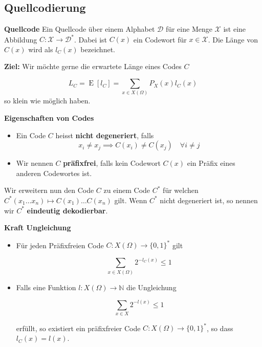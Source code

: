 \documentclass[25pt]{sciposter}
\newcommand{\N}{\mathbb{N}}
\newcommand{\E}{\operatorname{E}}
\newenvironment{defn}[1]{\begin{mdframed}[backgroundcolor=blue!10,innertopmargin=15pt, innerbottommargin=15pt,nobreak=true]
		\textbf{#1 }
	}
	{ 
	\end{mdframed}
}
\newenvironment{thm}[1]{\begin{mdframed}[backgroundcolor=Emerald!10,innertopmargin=15pt, innerbottommargin=15pt, nobreak=true]
		\textbf{#1 }
	}
	{ 
	\end{mdframed}
}
\begin{document}
\begin{multicols}{3}
\section{Quellcodierung}


\begin{defn}{Quellcode} Ein Quellcode über einem Alphabet $\mathcal{D}$ für eine Menge $\mathcal{X}$ ist eine Abbildung $C:\mathcal{X} \to \mathcal{D}^*$. Dabei ist $C(x)$ ein Codewort für $x\in \mathcal{X}$. Die Länge von $C(x)$ wird als $l_C(x)$ bezeichnet.
\end{defn}

\textbf{Ziel:} Wir möchte gerne die erwartete Länge eines Codes $C$

\begin{equation*}
L_C = \E[l_C] = \sum_{x\in X(\Omega)} P_X(x) l_C(x)
\end{equation*}
so klein wie möglich haben.




\begin{defn}{Eigenschaften von Codes}
	\begin{itemize}
		\item Ein Code $C$ heisst \textbf{nicht degeneriert}, falls $$x_i \neq x_j \implies C(x_i) \neq C(x_j) \quad \forall i\neq j$$
		\item Wir nennen $C$ \textbf{präfixfrei}, falls kein Codewort $C(x)$ ein Präfix eines anderen Codewortes ist.
	\end{itemize}
\end{defn}

Wir erweitern nun den Code $C$ zu einem Code $C^*$ für welchen $C^*(x_1 \ldots x_n) \mapsto C(x_1)\ldots C(x_n)$ gilt. Wenn $C^*$ nicht degeneriert ist, so nennen wir $C^*$ \textbf{eindeutig dekodierbar}.

\begin{thm}{Kraft Ungleichung}
\begin{itemize}
	\item Für jeden Präfixfreien Code $C:{X}(\Omega)\to \{0,1\}^*$ gilt 
	
	$$\sum_{x \in X(\Omega)} 2^{-l_C(x)} \leq 1$$
	
	\item Falls eine Funktion $l:X(\Omega)\to\N$ die Ungleichung
	
	$$\sum_{x\in X} 2^{-l(x)} \leq 1$$
	
	erfüllt, so existiert ein präfixfreier Code $C:X(\Omega) \to \{0,1\}^*$, so dass $l_C(x) = l(x)$.
\end{itemize}
\end{thm}


\end{multicols}
\end{document}
